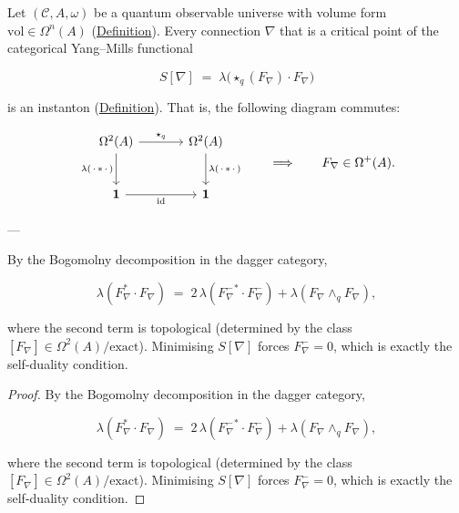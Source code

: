 \begin{proposition}
  \label{prop:categorical-self-duality}
Let $(\mathcal{C}, A, \omega)$ be a quantum observable universe
with volume form $\mathrm{vol} \in \Omega^n(A)$
(\hyperref[def:q-hodge-star]{Definition}).  Every connection $\nabla$
that is a critical point of the categorical Yang--Mills functional

\[
S[\nabla] \;=\; \lambda\!\bigl(\star_q(F_\nabla) \cdot F_\nabla\bigr)
\]

is an instanton (\hyperref[def:categorical-instanton]{Definition}).  That is,
the following diagram commutes:

\begin{equation}\label{eq:self-duality-cd}
\begin{tikzcd}[row sep=2.5em, column sep=3.5em]
  \Omega^2(A) \ar[r, "\star_q"] \ar[d, "\lambda(\,\cdot\, {*}\, \cdot\,)"']
  & \Omega^2(A) \ar[d, "\lambda(\,\cdot\, {*}\, \cdot\,)"] \\
  \mathbf{1} \ar[r, "\mathrm{id}"']
  & \mathbf{1}
\end{tikzcd}
\qquad\Longrightarrow\qquad
F_\nabla \in \Omega^+(A).
\end{equation}

---

By the Bogomolny decomposition in the dagger category,

\[
\lambda(F_\nabla^* \cdot F_\nabla)
  \;=\; 2\,\lambda({F_\nabla^-}^* \cdot F_\nabla^-)
        + \lambda(F_\nabla \wedge_q F_\nabla),
\]

where the second term is topological (determined by the class
$[F_\nabla] \in \Omega^2(A)/\mathrm{exact}$).  Minimising
$S[\nabla]$ forces $F_\nabla^- = 0$, which is exactly the
self-duality condition.
\end{proposition}
\begin{proof}
By the Bogomolny decomposition in the dagger category,

\[
\lambda(F_\nabla^* \cdot F_\nabla)
  \;=\; 2\,\lambda({F_\nabla^-}^* \cdot F_\nabla^-)
        + \lambda(F_\nabla \wedge_q F_\nabla),
\]

where the second term is topological (determined by the class
$[F_\nabla] \in \Omega^2(A)/\mathrm{exact}$).  Minimising
$S[\nabla]$ forces $F_\nabla^- = 0$, which is exactly the
self-duality condition.
\end{proof}

